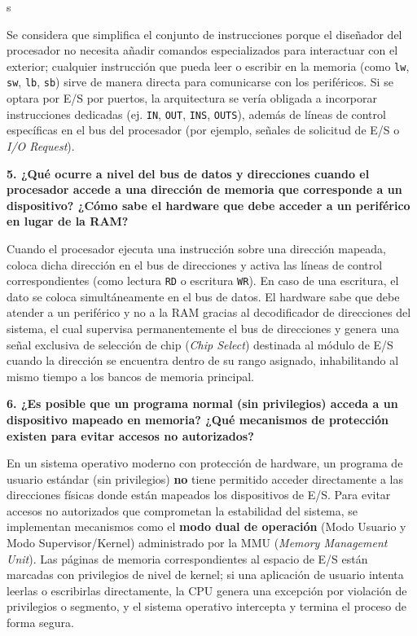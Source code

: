 s\documentclass[11pt,a4paper]{article}
\begin{document}
\vspace{0.5cm}
Se considera que simplifica el conjunto de instrucciones porque el diseñador del procesador no necesita añadir comandos especializados para interactuar con el exterior; cualquier instrucción que pueda leer o escribir en la memoria (como \texttt{lw}, \texttt{sw}, \texttt{lb}, \texttt{sb}) sirve de manera directa para comunicarse con los periféricos. Si se optara por E/S por puertos, la arquitectura se vería obligada a incorporar instrucciones dedicadas (ej. \texttt{IN}, \texttt{OUT}, \texttt{INS}, \texttt{OUTS}), además de líneas de control específicas en el bus del procesador (por ejemplo, señales de solicitud de E/S o \textit{I/O Request}).

\vspace{0.4cm}
\noindent\textbf{5. ¿Qué ocurre a nivel del bus de datos y direcciones cuando el procesador accede a una dirección de memoria que corresponde a un dispositivo? ¿Cómo sabe el hardware que debe acceder a un periférico en lugar de la RAM?}

\vspace{0.5cm}
Cuando el procesador ejecuta una instrucción sobre una dirección mapeada, coloca dicha dirección en el bus de direcciones y activa las líneas de control correspondientes (como lectura \texttt{RD} o escritura \texttt{WR}). En caso de una escritura, el dato se coloca simultáneamente en el bus de datos. El hardware sabe que debe atender a un periférico y no a la RAM gracias al decodificador de direcciones del sistema, el cual supervisa permanentemente el bus de direcciones y genera una señal exclusiva de selección de chip (\textit{Chip Select}) destinada al módulo de E/S cuando la dirección se encuentra dentro de su rango asignado, inhabilitando al mismo tiempo a los bancos de memoria principal.

\vspace{0.4cm}
\noindent\textbf{6. ¿Es posible que un programa normal (sin privilegios) acceda a un dispositivo mapeado en memoria? ¿Qué mecanismos de protección existen para evitar accesos no autorizados?}

\vspace{0.5cm}
En un sistema operativo moderno con protección de hardware, un programa de usuario estándar (sin privilegios) \textbf{no} tiene permitido acceder directamente a las direcciones físicas donde están mapeados los dispositivos de E/S. Para evitar accesos no autorizados que comprometan la estabilidad del sistema, se implementan mecanismos como el \textbf{modo dual de operación} (Modo Usuario y Modo Supervisor/Kernel) administrado por la MMU (\textit{Memory Management Unit}). Las páginas de memoria correspondientes al espacio de E/S están marcadas con privilegios de nivel de kernel; si una aplicación de usuario intenta leerlas o escribirlas directamente, la CPU genera una excepción por violación de privilegios o segmento, y el sistema operativo intercepta y termina el proceso de forma segura.
\end{document}
